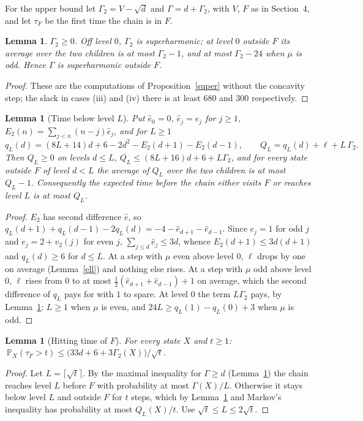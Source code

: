 \documentclass[11pt]{article}
\newtheorem{lemma}[theorem]{Lemma}
\theoremstyle{remark}
\newcommand{\PP}{\mathbb{P}}
\begin{document}
For the upper bound let $\Gamma_2=V-\sqrt d$ and $\Gamma=d+\Gamma_2$, with $V$, $F$ as in
Section~4, and let $\tau_F$ be the first time the chain is in $F$.

\begin{lemma}\label{gam}
$\Gamma_2\ge0$. Off level $0$, $\Gamma_2$ is superharmonic; at level $0$ outside $F$ its average
over the two children is at most $\Gamma_2-1$, and at most $\Gamma_2-24$ when $\mu$ is odd. Hence
$\Gamma$ is superharmonic outside $F$.
\end{lemma}
\begin{proof}
These are the computations of Proposition~\ref{super} without the concavity step; the slack in
cases (iii) and (iv) there is at least $680$ and $300$ respectively.
\end{proof}

\begin{lemma}[Time below level $L$]\label{ql}
Put $\hat e_0=0$, $\hat e_j=e_j$ for $j\ge1$, $E_2(n)=\sum_{j<n}(n-j)\hat e_j$, and for $L\ge1$
\[
q_L(d)=(8L+14)d+6-2d^2-E_2(d+1)-E_2(d-1),\qquad Q_L=q_L(d)+\ell+L\,\Gamma_2 .
\]
Then $Q_L\ge0$ on levels $d\le L$, $Q_L\le(8L+16)d+6+L\Gamma_2$, and for every state outside $F$
of level $d<L$ the average of $Q_L$ over the two children is at most $Q_L-1$. Consequently the
expected time before the chain either visits $F$ or reaches level $L$ is at most $Q_L$.
\end{lemma}
\begin{proof}
$E_2$ has second difference $\hat e$, so $q_L(d+1)+q_L(d-1)-2q_L(d)=-4-\hat e_{d+1}-\hat e_{d-1}$.
Since $e_j=1$ for odd $j$ and $e_j=2+v_2(j)$ for even $j$, $\sum_{j\le d}\hat e_j\le3d$, whence
$E_2(d+1)\le3d(d+1)$ and $q_L(d)\ge6$ for $d\le L$. At a step with $\mu$ even above level $0$,
$\ell$ drops by one on average (Lemma~\ref{ell}) and nothing else rises. At a step with $\mu$ odd
above level $0$, $\ell$ rises from $0$ to at most $\tfrac12(\hat e_{d+1}+\hat e_{d-1})+1$ on
average, which the second difference of $q_L$ pays for with $1$ to spare. At level $0$ the term
$L\Gamma_2$ pays, by Lemma~\ref{gam}: $L\ge1$ when $\mu$ is even, and $24L\ge q_L(1)-q_L(0)+3$
when $\mu$ is odd.
\end{proof}

\begin{lemma}[Hitting time of $F$]\label{tail}
For every state $X$ and $t\ge1$:
$\ \PP_X(\tau_F>t)\le\bigl(33d+6+3\Gamma_2(X)\bigr)/\sqrt t$.
\end{lemma}
\begin{proof}
Let $L=\lceil\sqrt t\rceil$. By the maximal inequality for $\Gamma\ge d$ (Lemma~\ref{gam}) the
chain reaches level $L$ before $F$ with probability at most $\Gamma(X)/L$. Otherwise it stays below
level $L$ and outside $F$ for $t$ steps, which by Lemma~\ref{ql} and Markov's inequality has
probability at most $Q_L(X)/t$. Use $\sqrt t\le L\le2\sqrt t$.
\end{proof}
\end{document}
